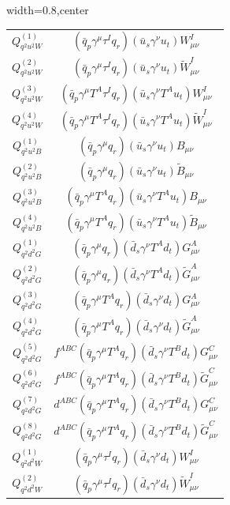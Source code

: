 \begin{table}[H]
\begin{center}
\begin{adjustbox}{width=0.8\textwidth,center}
\begin{minipage}[t]{6.1cm}
\begin{tabular}[t]{c|c}
%
$Q_{q^2u^2W}^{(1)}$  &  $(\bar q_p \gamma^\mu \tau^I q_r) (\bar u_s \gamma^\nu u_t) W^I_{\mu\nu}$ \\ 
%
$Q_{q^2u^2W}^{(2)}$  &  $(\bar q_p \gamma^\mu \tau^I q_r) (\bar u_s \gamma^\nu u_t) \widetilde W^I_{\mu\nu}$ \\ 
%
$Q_{q^2u^2W}^{(3)}$  &  $(\bar q_p \gamma^\mu T^A \tau^I q_r) (\bar u_s \gamma^\nu T^A u_t) W^I_{\mu\nu}$ \\ 
%
$Q_{q^2u^2W}^{(4)}$  &  $(\bar q_p \gamma^\mu T^A \tau^I q_r) (\bar u_s \gamma^\nu T^A u_t) \widetilde W^I_{\mu\nu}$ \\ 
%
$Q_{q^2u^2B}^{(1)}$  &  $(\bar q_p \gamma^\mu q_r) (\bar u_s \gamma^\nu u_t) B_{\mu\nu}$ \\ 
%
$Q_{q^2u^2B}^{(2)}$  &  $(\bar q_p \gamma^\mu q_r) (\bar u_s \gamma^\nu u_t) \widetilde B_{\mu\nu}$ \\ 
%
$Q_{q^2u^2B}^{(3)}$  &  $(\bar q_p \gamma^\mu T^A q_r) (\bar u_s \gamma^\nu T^A u_t) B_{\mu\nu}$ \\ 
%
$Q_{q^2u^2B}^{(4)}$  &  $(\bar q_p \gamma^\mu T^A q_r) (\bar u_s \gamma^\nu T^A u_t) \widetilde B_{\mu\nu}$ \\ 
%
$Q_{q^2d^2G}^{(1)}$  &  $(\bar q_p \gamma^\mu q_r) (\bar d_s \gamma^\nu T^A d_t) G^A_{\mu\nu}$ \\ 
%
$Q_{q^2d^2G}^{(2)}$  &  $(\bar q_p \gamma^\mu q_r) (\bar d_s \gamma^\nu T^A d_t) \widetilde G^A_{\mu\nu}$ \\ 
%
$Q_{q^2d^2G}^{(3)}$  &  $(\bar q_p \gamma^\mu T^A q_r) (\bar d_s \gamma^\nu d_t) G^A_{\mu\nu}$ \\ 
%
$Q_{q^2d^2G}^{(4)}$  &  $(\bar q_p \gamma^\mu T^A q_r) (\bar d_s \gamma^\nu d_t) \widetilde G^A_{\mu\nu}$ \\ 
%
$Q_{q^2d^2G}^{(5)}$  &  $f^{ABC} (\bar q_p \gamma^\mu T^A q_r) (\bar d_s \gamma^\nu T^B d_t) G^C_{\mu\nu}$ \\ 
%
$Q_{q^2d^2G}^{(6)}$  &  $f^{ABC} (\bar q_p \gamma^\mu T^A q_r) (\bar d_s \gamma^\nu T^B d_t) \widetilde G^C_{\mu\nu}$ \\ 
%
$Q_{q^2d^2G}^{(7)}$  &  $d^{ABC} (\bar q_p \gamma^\mu T^A q_r) (\bar d_s \gamma^\nu T^B d_t) G^C_{\mu\nu}$ \\ 
%
$Q_{q^2d^2G}^{(8)}$  &  $d^{ABC} (\bar q_p \gamma^\mu T^A q_r) (\bar d_s \gamma^\nu T^B d_t) \widetilde G^C_{\mu\nu}$ \\ 
%
$Q_{q^2d^2W}^{(1)}$  &  $(\bar q_p \gamma^\mu \tau^I q_r) (\bar d_s \gamma^\nu d_t) W^I_{\mu\nu}$ \\ 
%
$Q_{q^2d^2W}^{(2)}$  &  $(\bar q_p \gamma^\mu \tau^I q_r) (\bar d_s \gamma^\nu d_t) \widetilde W^I_{\mu\nu}$ \\ 

\end{tabular}
\end{minipage}
\end{adjustbox}
\end{center}
\end{table}
